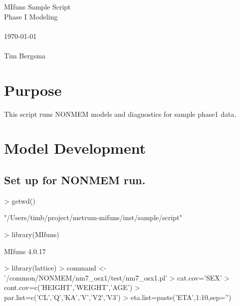 
\usepackage{Sweave}

 

\vspace*{2cm}
\begin{center}
{\Large MIfuns Sample Script}\\
\vspace{1.5cm}
{\Large Phase I Modeling}\\
~\\
\today\\
~\\
Tim Bergsma\\
\end{center}
\newpage

\section{Purpose}
This script runs NONMEM models and diagnostics for sample phase1 data.
\section{Model Development}
\subsection{Set up for NONMEM run.}
\begin{Schunk}
\begin{Sinput}
> getwd()
\end{Sinput}
\begin{Soutput}
[1] "/Users/timb/project/metrum-mifuns/inst/sample/script"
\end{Soutput}
\begin{Sinput}
> library(MIfuns)
\end{Sinput}
\begin{Soutput}
MIfuns 4.0.17 
\end{Soutput}
\begin{Sinput}
> library(lattice)
> command <- '/common/NONMEM/nm7_osx1/test/nm7_osx1.pl'
> cat.cov='SEX'
> cont.cov=c('HEIGHT','WEIGHT','AGE')
> par.list=c('CL','Q','KA','V','V2','V3')
> eta.list=paste('ETA',1:10,sep='')
\end{Sinput}
\end{Schunk}
